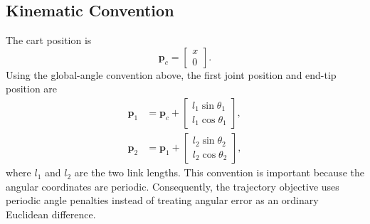 \documentclass[conference]{IEEEtran}
\begin{document}
\subsection{Kinematic Convention}
The cart position is
\begin{equation}
\bm{p}_c=\begin{bmatrix}x\\0\end{bmatrix}.
\end{equation}
Using the global-angle convention above, the first joint position and end-tip position are
\begin{align}
\bm{p}_1
&=
\bm{p}_c+
\begin{bmatrix}
l_1\sin\theta_1\\
l_1\cos\theta_1
\end{bmatrix},\\
\bm{p}_2
&=
\bm{p}_1+
\begin{bmatrix}
l_2\sin\theta_2\\
l_2\cos\theta_2
\end{bmatrix},
\end{align}
where $l_1$ and $l_2$ are the two link lengths. This convention is important because the angular coordinates are periodic. Consequently, the trajectory objective uses periodic angle penalties instead of treating angular error as an ordinary Euclidean difference.
\end{document}
